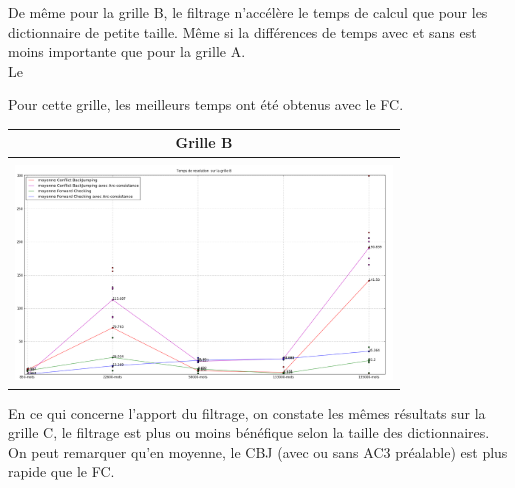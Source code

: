 \documentclass[a4paper,12pt]{report}
\begin{document}
\begin{enumerate}
\begin{table}[!h]
\begin{center}
\begin{tabular}{|c|}
\end{tabular}
\end{center}
\end{table}

De même pour la grille B, le filtrage n'accélère le temps de calcul que pour les dictionnaire de petite taille. Même si la différences de temps avec et sans est moins importante que pour la grille A.\\

Le

Pour cette grille, les meilleurs temps ont été obtenus avec le FC.\\

\begin{table}[!h]
\begin{center}
\begin{tabular}{|c|}

\hline
Grille B \\
\hline 
\\
\includegraphics[width=10cm]{Grille_B.png} \\
\hline


\end{tabular}
\end{center}
\end{table}

En ce qui concerne l'apport du filtrage, on constate les mêmes résultats sur la grille C, le filtrage est plus ou moins bénéfique selon la taille des dictionnaires. \\

On peut remarquer qu'en moyenne, le CBJ (avec ou sans AC3 préalable) est plus rapide que le FC.\\

\begin{table}[!h]
\begin{center}
\begin{tabular}{|c|}


\end{tabular}
\end{center}
\end{table}
\end{enumerate}
\end{document}

